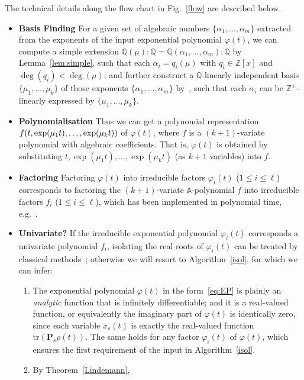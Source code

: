 \documentclass[a4paper,UKenglish,cleveref,autoref,thm-restate,authorcolumns]{lipics-v2019}
\newcommand{\PP}{\mathbf{P}}
\newcommand{\tr}{\mathrm{tr}}
\begin{document}
The technical details along the flow chart in Fig.~\ref{flow} are described below.
\begin{itemize}
	\item \textbf{Basis Finding}
	For a given set of algebraic numbers $\{\alpha_1,\ldots,\alpha_m\}$
	extracted from the exponents of the input exponential polynomial $\varphi(t)$,
	we can compute a simple extension
	$\mathbb{Q}(\mu):\mathbb{Q}=\mathbb{Q}(\alpha_1,\ldots,\alpha_m):\mathbb{Q}$
	by Lemma~\ref{lem:simple},
	such that each $\alpha_i=q_i(\mu)$ with $q_i\in \mathbb{Z}[x]$ and $\deg(q_i)<\deg(\mu)$;
	and further construct a $\mathbb{Q}$-linearly independent basis $\{\mu_1,\ldots,\mu_k\}$
	of those exponents $\{\alpha_1,\ldots,\alpha_m\}$ by~\cite[Section~3]{HLX+18},
	such that each $\alpha_i$ can be $\mathbb{Z}^+$-linearly expressed by $\{\mu_1,\ldots,\mu_k\}$.
	\item \textbf{Polynomialisation}
	Thus we can get a polynomial representation
	$f(t,\exp(\mu_1 t),\ldots,\linebreak[0]\exp(\mu_k t))$
	of $\varphi(t)$, where $f$ is a $(k+1)$-variate polynomial with algebraic coefficients.
	That is, $\varphi(t)$ is obtained by
	substituting $t,\exp(\mu_1 t),\ldots,\exp(\mu_k t)$ (as $k+1$ variables) into $f$.
	\item \textbf{Factoring}
	Factoring $\varphi(t)$ into irreducible factors $\varphi_i(t)$ ($1 \le i \le \ell$)
	corresponds to
	factoring the $(k+1)$-variate $\mathbb{A}$-polynomial $f$
	into irreducible factors $f_i$ ($1 \le i \le \ell$),
	which has been implemented in polynomial time, e.g.~\cite{Kal85}.
	\item \textbf{Univariate?}
	If the irreducible exponential polynomial $\varphi_i(t)$ corresponds
	a univariate polynomial $f_i$,
	isolating the real roots of $\varphi_i(t)$ can be treated by classical methods~\cite{CoL76};
	otherwise we will resort to Algorithm~\ref{isol},
	for which we can infer:
	\begin{enumerate}
		\item The exponential polynomial $\varphi(t)$ in the form~\eqref{eq:EP}
	    is plainly an \emph{analytic} function that is infinitely differentiable;
	    and it is a real-valued function,
	    or equivalently the imaginary part of $\varphi(t)$ is identically zero,
	    since each variable $x_s(t)$ is exactly the real-valued function $\tr(\PP_s \rho(t))$.
	    The same holds for any factor $\varphi_i(t)$ of $\varphi(t)$,
	    which ensures the first requirement of the input in Algorithm~\ref{isol}.
        \item By Theorem~\ref{Lindemann},

\end{enumerate}
\end{itemize}
\end{document}
